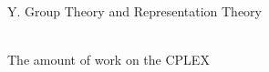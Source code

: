 \documentclass[11pt]{report}
\begin{document}
\begin{LARGE}
Y. Group Theory and Representation Theory
\end{LARGE}
\\

The amount of work on the CPLEX
\end{document}
